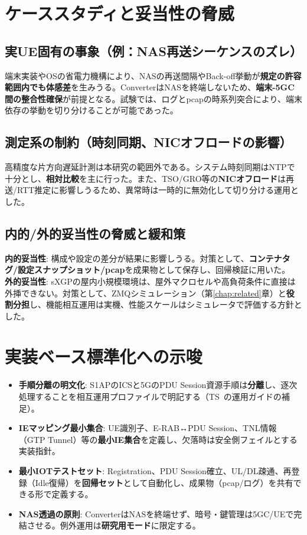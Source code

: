 \section{ケーススタディと妥当性の脅威}
\subsection{実UE固有の事象（例：NAS再送シーケンスのズレ）}
端末実装やOSの省電力機構により、NASの再送間隔やBack-off挙動が\textbf{規定の許容範囲内でも体感差}を生みうる。ConverterはNASを終端しないため、\textbf{端末-5GC間の整合性確保}が前提となる。試験では、ログとpcapの時系列突合により、端末依存の挙動を切り分けることが可能であった。

\subsection{測定系の制約（時刻同期、NICオフロードの影響）}
高精度な片方向遅延計測は本研究の範囲外である。システム時刻同期はNTPで十分とし、\textbf{相対比較}を主に行った。また、TSO/GRO等の\textbf{NICオフロード}は再送/RTT推定に影響しうるため、異常時は一時的に無効化して切り分ける運用とした。

\subsection{内的/外的妥当性の脅威と緩和策}
\textbf{内的妥当性}: 構成や設定の差分が結果に影響しうる。対策として、\textbf{コンテナタグ/設定スナップショット/pcap}を成果物として保存し、回帰検証に用いた。\\
\textbf{外的妥当性}: sXGPの屋内小規模環境は、屋外マクロセルや高負荷条件に直接は外挿できない。対策として、ZMQシミュレーション（第\ref{chap:related}章）と\textbf{役割分担}し、機能相互運用は実機、性能スケールはシミュレータで評価する方針とした。

\section{実装ベース標準化への示唆}
\begin{itemize}
  \item \textbf{手順分離の明文化}: S1APのICSと5GのPDU Session資源手順は\textbf{分離}し、逐次処理することを相互運用プロファイルで明記する（TS~\cite{threegpp-23502}の運用ガイドの補足）。
  \item \textbf{IEマッピング最小集合}: UE識別子、E-RAB↔PDU Session、TNL情報（GTP Tunnel）等の\textbf{最小IE集合}を定義し、欠落時は安全側フェイルとする実装指針。
  \item \textbf{最小IOTテストセット}: Registration、PDU Session確立、UL/DL疎通、再登録（Idle復帰）を\textbf{回帰セット}として自動化し、成果物（pcap/ログ）を共有できる形で定義する。
  \item \textbf{NAS透過の原則}: ConverterはNASを終端せず、暗号・鍵管理は5GC/UEで完結させる。例外運用は\textbf{研究用モード}に限定する。
\end{itemize}
